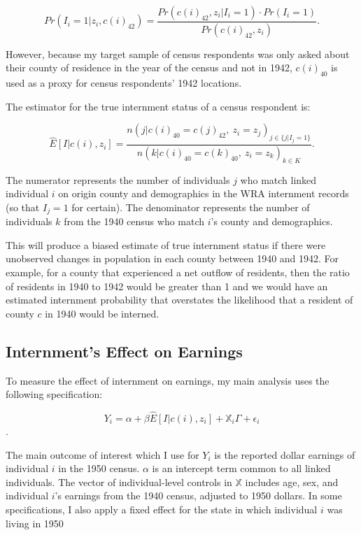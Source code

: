 $$
Pr(I_i=1|z_i, c(i)_{42}) = 
\frac{Pr\left(c(i)_{42}, z_i|I_i=1\right) \cdot Pr(I_i=1)}{Pr(c(i)_{42}, z_i)}.
$$

However, because my target sample of census respondents 
was only asked about their county of residence in the year of the census 
and not in 1942, $c(i)_{40}$ is used as a proxy 
for census respondents' 1942 locations.

The estimator for the true internment status of a census respondent is:

\begin{equation}\label{eq:predint}
\hat{E}[I|c(i), z_i] =
\frac{n(j |c(i)_{40}=c(j)_{42} , ~ z_i=z_j)_{j\in \{j | I_j = 1\}}}
{n(k | c(i)_{40}=c(k)_{40}, ~ z_i=z_k)_{k\in K}}.
\end{equation}

The numerator represents the number of individuals $j$ 
who match linked individual $i$ on origin county and demographics
in the WRA internment records (so that $I_j = 1$ for certain).
The denominator represents the number of individuals $k$ from the 1940 census
who match $i$'s county and demographics.

This will produce a biased estimate of true internment status 
if there were unobserved changes in population 
in each county between 1940 and 1942.
For example, for a county that experienced a net outflow of residents, 
then the ratio of residents in 1940 to 1942 would be greater than 1 
and we would have an estimated internment probability 
that overstates the likelihood that a resident of county $c$ in 1940 
would be interned.

\subsection{Internment's Effect on Earnings}\label{sec:wage-reg}

To measure the effect of internment on earnings, 
my main analysis uses the following specification:

\begin{equation}\label{eq:mainreg}
  Y_i = \alpha + \beta \hat{E}[I|c(i), z_i] + \mathbb{X}_i \Gamma + \epsilon_i
\end{equation}.

The main outcome of interest which I use for $Y_i$ 
is the reported dollar earnings of individual $i$ in the 1950 census.
$\alpha$ is an intercept term common to all linked individuals.
The vector of individual-level controls in $\mathbb{X}$ 
includes age, sex, and individual $i$'s earnings from the 1940 census,
adjusted to 1950 dollars.
In some specifications,
I also apply a fixed effect for the state 
in which individual $i$ was living in 1950

